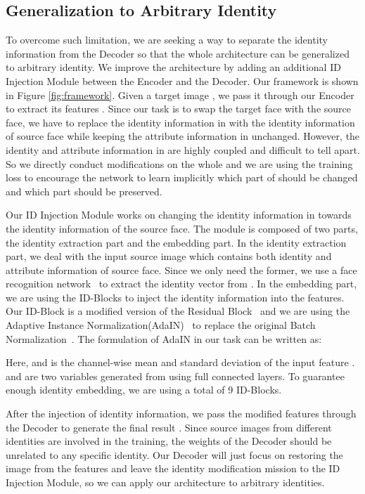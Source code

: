 \documentclass[sigconf]{acmart}
\begin{document}
\subsection{Generalization to Arbitrary Identity}
To overcome such limitation, we are seeking a way to separate the identity information from the Decoder so that the whole architecture can be generalized to arbitrary identity. We improve the architecture by adding an additional ID Injection Module between the Encoder and the Decoder. Our framework is shown in Figure \ref{fig:framework}. Given a target image , we pass it through our Encoder to extract its features . Since our task is to swap the target face with the source face, we have to replace the identity information in  with the identity information of source face while keeping the attribute information in  unchanged. However, the identity and attribute information in  are highly coupled and difficult to tell apart. So we directly conduct modifications on the whole  and we are using the training loss to encourage the network to learn implicitly which part of  should be changed and which part should be preserved.

Our ID Injection Module works on changing the identity information in  towards the identity information of the source face. The module is composed of two parts, the identity extraction part and the embedding part. In the identity extraction part, we deal with the input source image  which contains both identity and attribute information of source face. Since we only need the former, we use a face recognition network~\cite{DBLP:ArcFace} to extract the identity vector  from . In the embedding part, we are using the ID-Blocks to inject the identity information into the features. Our ID-Block is a modified version of the Residual Block~\cite{DBLP:ResNet} and we are using the Adaptive Instance Normalization(AdaIN)~\cite{DBLP:AdaIN} to replace the original Batch Normalization~\cite{DBLP:BN}. The formulation of AdaIN in our task can be written as:

Here,  and  is the channel-wise mean and standard deviation of the input feature .  and  are two variables generated from  using full connected layers. To guarantee enough identity embedding, we are using a total of 9 ID-Blocks.

After the injection of identity information, we pass the modified features through the Decoder to generate the final result . Since source images from different identities are involved in the training, the weights of the Decoder should be unrelated to any specific identity. Our Decoder will just focus on restoring the image from the features and leave the identity modification mission to the ID Injection Module, so we can apply our architecture to arbitrary identities.
\end{document}
